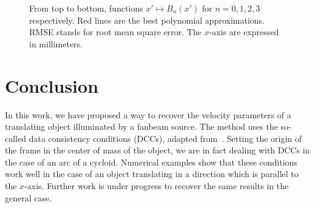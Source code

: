 \documentclass[twocolumn]{IEEEtran}
\numberwithin{equation}{section}
\begin{document}
\begin{figure}[!ht]
\begin{tabular}{cc}
	\end{tabular}
	\caption{From top to bottom, functions $x' \mapsto B_n(x')$ for $n = 0,1,2,3$ respectively. Red lines are the best polynomial approximations. RMSE stands for root mean square error. The $x$-axis are expressed in millimeters.\label{fig:Bnx}}
\end{figure}

\section{Conclusion}
In this work, we have proposed a way to recover the velocity parameters of a translating object illuminated by a fanbeam source. The method uses the so-called data consistency conditions (DCCs), adapted from~\cite{clackdoyle2015consistency}. Setting the origin of the frame in the center of mass of the object, we are in fact dealing with DCCs in the case of an arc of a cycloid. Numerical examples show that these conditions work well in the case of an object translating in a direction which is parallel to the $x$-axis. Further work is under progress to recover the same results in the general case.




\end{document}
